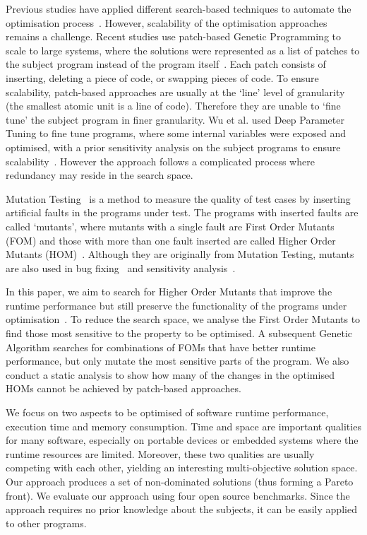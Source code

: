 \documentclass[oribibl]{llncs}
\begin{document}
Previous studies have applied different search-based techniques to automate the optimisation process~\cite{arcuri-ssbse-2011, 6035728,Brake:2008:ADS:1370018.1370031,hutter2009paramils}.
However, scalability of the optimisation approaches remains a challenge.
Recent studies use patch-based Genetic Programming to scale to large systems, where the solutions were represented as a list of patches to the subject program instead of the program itself~\cite{Bruce:2015:REC:2739480.2754752,geneticimprovementJP}.
Each patch consists of inserting, deleting a piece of code, or swapping pieces of code.
To ensure scalability, patch-based approaches are usually at the `line' level of granularity (the smallest atomic unit is a line of code). 
Therefore they are unable to `fine tune' the subject program in finer granularity. 
Wu et al. used Deep Parameter Tuning to fine tune programs, where some internal variables were exposed and optimised, with a prior sensitivity analysis on the subject programs to ensure scalability~\cite{Wu:2015:DPO:2739480.2754648}.
However the approach follows a complicated process where redundancy may reside in the search space.

Mutation Testing~\cite{demillo1978hints,5487526} is a method to measure the quality of test cases by inserting artificial faults in the programs under test.
The programs with inserted faults are called `mutants', where mutants with a single fault are First Order Mutants (FOM) and those with more than one fault inserted are called Higher Order Mutants (HOM)~\cite{Harman:2011:SHO:2025113.2025144}.
Although they are originally from Mutation Testing, mutants are also used in bug fixing~\cite{6035728} and sensitivity analysis~\cite{Wu:2015:DPO:2739480.2754648}.

In this paper, we aim to search for Higher Order Mutants that improve the runtime performance but still preserve the functionality of the programs under optimisation~\cite{Jia:2015:GIU:2739482.2768417}.
To reduce the search space, we analyse the First Order Mutants to find those most sensitive to the property to be optimised.
A subsequent Genetic Algorithm searches for combinations of FOMs that have better runtime performance, but only mutate the most sensitive parts of the program.
We also conduct a static analysis to show how many of the changes in the optimised HOMs cannot be achieved by patch-based approaches.

We focus on two aspects to be optimised of software runtime performance, execution time and memory consumption.
Time and space are important qualities for many software, especially on portable devices or embedded systems where the runtime resources are limited.
Moreover, these two qualities are usually competing with each other, yielding an interesting multi-objective solution space.
Our approach produces a set of non-dominated solutions (thus forming a Pareto front).
We evaluate our approach using four open source benchmarks. 
Since the approach requires no prior knowledge about the subjects, it can be easily applied to other programs.
\end{document}
